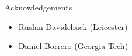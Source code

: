 \begin{frame}{Acknowledgements}
 \begin{itemize}
  \item Ruslan Davidchuck (Leicester)
  \item Daniel Borrero (Georgia Tech)
 \end{itemize}

\end{frame}






